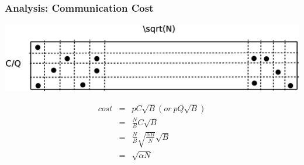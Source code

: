 \documentclass[red]{beamer}
\begin{document}
\begin{frame}
\frametitle{Analysis: Communication Cost}
\center
\includegraphics[scale=0.25]{figs/cost_area}

\begin{eqnarray*}\label{th}
cost &=& pC\sqrt{B}  (or\  pQ\sqrt{B})\\
  &=& \frac{N}{B}C\sqrt{B}\\
  &=& \frac{N}{B}\sqrt{\frac{\alpha B}{N}}\sqrt{B}\\
  &=& \sqrt{\alpha N}
\end{eqnarray*}
\end{frame}
\end{document}

